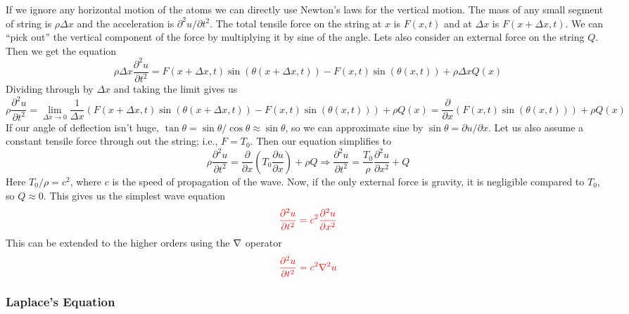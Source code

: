 \documentclass[reqno]{amsart}
\theoremstyle{definition}
\begin{document}
If we ignore any horizontal motion of the atoms we can directly use Newton's laws
for the vertical motion.  The mass of any small segment of string is $\rho\Delta x$
and the acceleration is $\partial^2 u/\partial t^2$.  The total tensile force on the
string at $x$ is $F(x,t)$ and at $\Delta x$ is $F(x+\Delta x,t)$.  We can ``pick out''
the vertical component of the force by multiplying it by sine of the angle.  Lets also
consider an external force on the string $Q$.  Then we get the equation
%
\begin{equation}
\rho\Delta x\frac{\partial^2 u}{\partial t^2} = F(x+\Delta x,t)\sin(\theta(x+\Delta x,t))
- F(x,t)\sin(\theta(x,t)) + \rho\Delta x Q(x)
\end{equation}
%
Dividing through by $\Delta x$ and taking the limit gives us
%
\begin{equation*}
\rho \frac{\partial^2 u}{\partial t^2} = \lim_{\Delta x \rightarrow 0} \frac{1}{\Delta x}
\left(F(x+\Delta x,t)\sin(\theta(x+\Delta x,t)) - F(x,t)\sin(\theta(x,t))\right)
+ \rho Q(x) = \frac{\partial}{\partial x}\left(F(x,t)\sin(\theta(x,t))\right) + \rho Q(x)
\end{equation*}
%
If our angle of deflection isn't huge, $\tan\theta = \sin\theta/\cos\theta \approx \sin\theta$,
so we can approximate sine by $\sin\theta = \partial u/\partial x$.  Let us also assume
a constant tensile force through out the string; i.e., $F = T_0$.
Then our equation simplifies to
%
\begin{equation}
\rho \frac{\partial^2 u}{\partial t^2} = \frac{\partial}{\partial x}
\left(T_0 \frac{\partial u}{\partial x}\right) + \rho Q
\Rightarrow \frac{\partial^2 u}{\partial t^2} = \frac{T_0}{\rho}
\frac{\partial^2 u}{\partial x^2} + Q
\end{equation}
%
Here $T_0/\rho = c^2$, where $c$ is the speed of propagation of the wave.  Now,
if the only external force is gravity, it is negligible compared to $T_0$, so
$Q \approx 0$.  This gives us the simplest wave equation
%
\begin{equation}
\color{red}\frac{\partial^2 u}{\partial t^2} = c^2\frac{\partial^2 u}{\partial x^2}
\end{equation}
%
This can be extended to the higher orders using the $\nabla$ operator
%
\begin{equation}
\color{red}\frac{\partial^2 u}{\partial t^2} = c^2\nabla^2 u
\end{equation}

\bigskip
\bigskip

\subsubsection*{Laplace's Equation}
\end{document}
